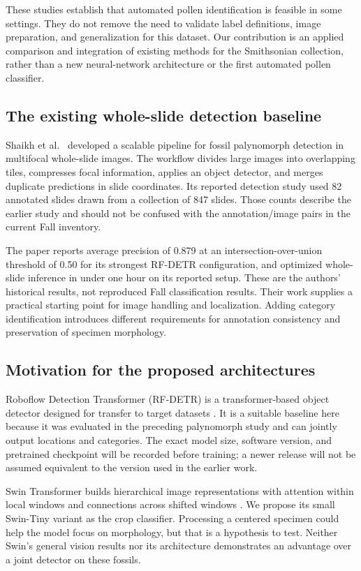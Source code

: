 \documentclass[11pt,letterpaper]{article}
\begin{document}
These studies establish that automated pollen identification is feasible in some settings. They do not remove the need to validate label definitions, image preparation, and generalization for this dataset. Our contribution is an applied comparison and integration of existing methods for the Smithsonian collection, rather than a new neural-network architecture or the first automated pollen classifier.

\subsection{The existing whole-slide detection baseline}
Shaikh et al.\ \citep{shaikh2026} developed a scalable pipeline for fossil palynomorph detection in multifocal whole-slide images. The workflow divides large images into overlapping tiles, compresses focal information, applies an object detector, and merges duplicate predictions in slide coordinates. Its reported detection study used 82 annotated slides drawn from a collection of 847 slides. Those counts describe the earlier study and should not be confused with the \SlideCount{} annotation/image pairs in the current Fall inventory.

The paper reports average precision of 0.879 at an intersection-over-union threshold of 0.50 for its strongest RF-DETR configuration, and optimized whole-slide inference in under one hour on its reported setup. These are the authors' historical results, not reproduced Fall classification results. Their work supplies a practical starting point for image handling and localization. Adding category identification introduces different requirements for annotation consistency and preservation of specimen morphology.

\subsection{Motivation for the proposed architectures}
Roboflow Detection Transformer (RF-DETR) is a transformer-based object detector designed for transfer to target datasets \citep{robinson2026}. It is a suitable baseline here because it was evaluated in the preceding palynomorph study and can jointly output locations and categories. The exact model size, software version, and pretrained checkpoint will be recorded before training; a newer release will not be assumed equivalent to the version used in the earlier work.

Swin Transformer builds hierarchical image representations with attention within local windows and connections across shifted windows \citep{liu2021}. We propose its small Swin-Tiny variant as the crop classifier. Processing a centered specimen could help the model focus on morphology, but that is a hypothesis to test. Neither Swin's general vision results nor its architecture demonstrates an advantage over a joint detector on these fossils.
\end{document}
